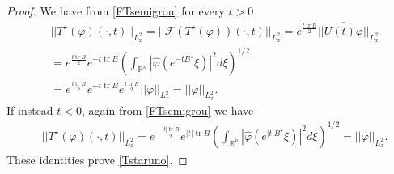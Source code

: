 \documentclass[11pt,letter]{amsart}
\def \phi {\varphi}
\def \vf{\varphi}
\newcommand{\Rn}{\mathbb R^n}
\numberwithin{equation}{section}
\newcommand{\tr}{\operatorname{tr}}
\numberwithin{equation}{section}
\begin{document}
\begin{proof}
We have from \eqref{FTsemigrou} for every $t>0$
\begin{align*}
& ||T^\star(\vf)(\cdot,t)||_{L^2_x} = ||\mathscr F(T^\star(\vf))(\cdot,t)||_{L^2_x} = e^{\frac{t \tr B}2} ||\widehat{U(t)\vf}||_{L^2_x}
\\
& = e^{\frac{t \tr B}2} e^{- t \tr B} \left(\int_{\Rn} |\hat{\vf}(e^{-tB^{\star}}\xi)|^2 d\xi\right)^{1/2} 
\\
& = e^{\frac{t \tr B}2} e^{- t \tr B} e^{\frac{t \tr B}2} ||\vf||_{L^2_x} = ||\vf||_{L^2_x}.
\end{align*}
If instead $t<0$, again from \eqref{FTsemigrou} we have 
\begin{align*}
& ||T^\star(\vf)(\cdot,t)||_{L^2_x} = e^{-\frac{|t| \tr B}2} e^{|t| \tr B} \left(\int_{\Rn} |\hat{\phi}(e^{|t|B^{\star}}\xi)|^2 d\xi\right)^{1/2} = ||\vf||_{L^2_x}.
\end{align*}
These identities prove \eqref{Tstaruno}.

\end{proof}
\end{document}
